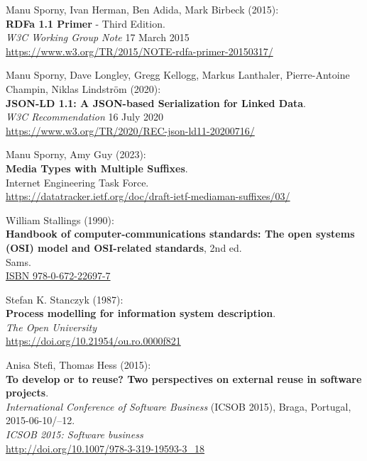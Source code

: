 \begin{thebibliography}{9}
Manu Sporny, Ivan Herman, Ben Adida, Mark Birbeck (2015):\\
\textbf{RDFa 1.1 Primer} - Third Edition. \\
\emph{W3C Working Group Note} 17 March 2015 \\
\url{https://www.w3.org/TR/2015/NOTE-rdfa-primer-20150317/}

Manu Sporny, Dave Longley, Gregg Kellogg, Markus Lanthaler, Pierre-Antoine Champin, Niklas Lindström (2020):\\
\textbf{JSON-LD 1.1: A JSON-based Serialization for Linked Data}.\\
\emph{W3C Recommendation} 16 July 2020\\
\url{https://www.w3.org/TR/2020/REC-json-ld11-20200716/}

Manu Sporny, Amy Guy (2023): \\
\textbf{{Media Types with Multiple Suffixes}}.\\
Internet Engineering Task Force.\\
\url{https://datatracker.ietf.org/doc/draft-ietf-mediaman-suffixes/03/}
 
 William Stallings (1990): \\
\textbf{Handbook of computer-communications standards: {The} open systems ({OSI}) model and {OSI-related} standards}, 2nd ed. \\
Sams.\\
\href{https://identifiers.org/isbn/9780672226977}{ISBN 978-0-672-22697-7}
 
Stefan K. Stanczyk (1987): \\
\textbf{Process modelling for information system description}.\\
\emph{The Open University} \\
\url{https://doi.org/10.21954/ou.ro.0000f821}

Anisa Stefi, Thomas Hess (2015): \\
\textbf{To develop or to reuse? Two perspectives on external reuse in software projects}. \\
\emph{International Conference of Software Business} (ICSOB 2015), Braga, Portugal, 2015-06-10/--12.\\
\emph{ICSOB 2015: Software business} \\
\url{http://doi.org/10.1007/978-3-319-19593-3_18}


\end{thebibliography}
